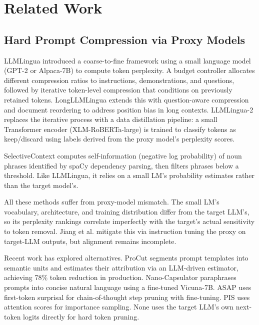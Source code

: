 \documentclass[11pt,letterpaper]{article}
\begin{document}
\section{Related Work}

\subsection{Hard Prompt Compression via Proxy Models}

LLMLingua \citep{Jiang2023} introduced a coarse-to-fine framework using a small language model (GPT-2 or Alpaca-7B) to compute token perplexity. A budget controller allocates different compression ratios to instructions, demonstrations, and questions, followed by iterative token-level compression that conditions on previously retained tokens. LongLLMLingua \citep{Jiang2024} extends this with question-aware compression and document reordering to address position bias in long contexts. LLMLingua-2 \citep{Pan2024} replaces the iterative process with a data distillation pipeline: a small Transformer encoder (XLM-RoBERTa-large) is trained to classify tokens as keep/discard using labels derived from the proxy model's perplexity scores.

SelectiveContext \citep{Li2023} computes self-information (negative log probability) of noun phrases identified by spaCy dependency parsing, then filters phrases below a threshold. Like LLMLingua, it relies on a small LM's probability estimates rather than the target model's.

All these methods suffer from proxy-model mismatch. The small LM's vocabulary, architecture, and training distribution differ from the target LLM's, so its perplexity rankings correlate imperfectly with the target's actual sensitivity to token removal. Jiang et al. \citep{Jiang2023} mitigate this via instruction tuning the proxy on target-LLM outputs, but alignment remains incomplete.

Recent work has explored alternatives. ProCut \citep{Xu2025} segments prompt templates into semantic units and estimates their attribution via an LLM-driven estimator, achieving 78\% token reduction in production. Nano-Capsulator \citep{Chuang2024} paraphrases prompts into concise natural language using a fine-tuned Vicuna-7B. ASAP \citep{Zeng2025} uses first-token surprisal for chain-of-thought step pruning with fine-tuning. PIS \citep{Chen2025} uses attention scores for importance sampling. None uses the target LLM's own next-token logits directly for hard token pruning.
\end{document}
